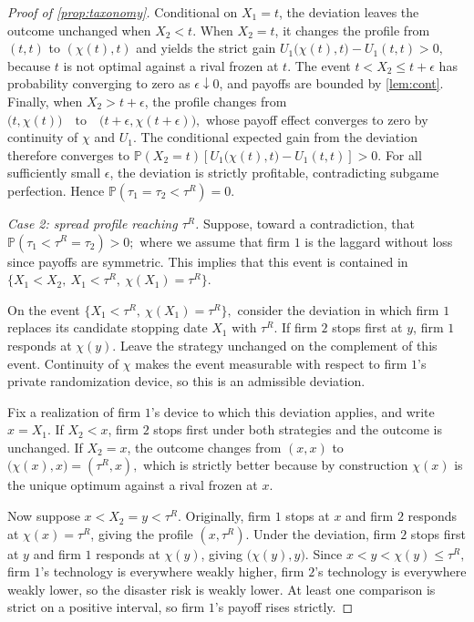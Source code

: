 \documentclass[12pt,reqno]{article}
\renewcommand{\Pr}{\mathbb{P}}
\theoremstyle{definition} \newtheorem{example}{Example}
\theoremstyle{definition} \newtheorem{condition}{Condition}
\theoremstyle{definition} \newtheorem{corollary}{Corollary}
\theoremstyle{definition} \newtheorem{claim}{Claim}
\theoremstyle{definition} \newtheorem{definition}{Definition}
\theoremstyle{definition} \newtheorem{conjecture}{Conjecture}
\theoremstyle{definition} \newtheorem{Lemma}{Lemma}
\theoremstyle{definition} \newtheorem{lemma}{Lemma}
\theoremstyle{plain} \newtheorem{theorem}{Theorem}
\theoremstyle{definition} \newtheorem{assumption}{Assumption}
\theoremstyle{definition} \newtheorem*{assumptionnonumber}{Assumption}
\theoremstyle{definition} \newtheorem*{theoremNoNumber}{Proposition}
\theoremstyle{definition}
\theoremstyle{definition}\newtheorem{proposition}{Proposition}
\theoremstyle{definition} \newtheorem{result}{Result}
\theoremstyle{definition} \newtheorem*{definitionNoNumber}{Definition}
\theoremstyle{definition} \newtheorem{Definition}{Definition}
\theoremstyle{definition} \newtheorem*{DefinitionNoNumber}{Definition}
\theoremstyle{definition} \newtheorem*{fact}{Fact}
\theoremstyle{definition} \newtheorem*{property}{Property}
\theoremstyle{definition} \newtheorem{remark}{Remark}
\begin{document}
\begin{proof}[Proof of \cref{prop:taxonomy}]
Conditional on $X_1=t$, the deviation leaves the outcome unchanged when $X_2<t$. When $X_2=t$, it changes the profile from $(t,t)$ to $(\chi(t),t)$ and yields the strict gain
$
U_1\bigl(\chi(t),t\bigr)-U_1(t,t)>0,
$
because $t$ is not optimal against a rival frozen at $t$. The event
$
t<X_2\leq t+\epsilon
$
has probability converging to zero as $\epsilon\downarrow0$, and payoffs are bounded by \cref{lem:cont}. Finally, when $X_2>t+\epsilon$, the profile changes from
$
\bigl(t,\chi(t)\bigr)
\quad\text{to}\quad
\bigl(t+\epsilon,\chi(t+\epsilon)\bigr),
$
whose payoff effect converges to zero by continuity of $\chi$ and $U_1$. The conditional expected gain from the deviation therefore converges to
$
\Pr(X_2=t)
\left[
U_1\bigl(\chi(t),t\bigr)-U_1(t,t)
\right]
>0.
$
For all sufficiently small $\epsilon$, the deviation is strictly profitable, contradicting subgame perfection. Hence
$
\Pr(\tau_1=\tau_2<\tau^R)=0.
$

\smallskip
\noindent\emph{Case 2: spread profile reaching $\tau^R$.}
Suppose, toward a contradiction, that
$
\Pr(\tau_1<\tau^R=\tau_2)>0;
$
where we assume that firm $1$ is the laggard without loss since payoffs are symmetric. This implies
that this event is contained in
$
\{X_1<X_2,\ X_1<\tau^R,\ \chi(X_1)=\tau^R\}.
$

On the event
$
\{X_1<\tau^R,\ \chi(X_1)=\tau^R\},
$
consider the deviation in which firm $1$ replaces its candidate stopping date $X_1$ with $\tau^R$. If firm
$2$ stops first at $y$, firm $1$ responds at $\chi(y)$. Leave the strategy
unchanged on the complement of this event. Continuity of $\chi$ makes the
event measurable with respect to firm $1$'s private randomization device, so
this is an admissible deviation.

Fix a realization of firm $1$'s device to which this deviation applies, and
write $x=X_1$. If $X_2<x$, firm $2$ stops first under both strategies and the
outcome is unchanged. If $X_2=x$, the outcome
changes from $(x,x)$ to
$
\bigl(\chi(x),x\bigr)=(\tau^R,x),
$
which is strictly better because by construction $\chi(x)$ is the unique optimum against a
rival frozen at $x$.

Now suppose $x<X_2=y<\tau^R$. Originally, firm $1$ stops at $x$ and firm
$2$ responds at $\chi(x)=\tau^R$, giving the profile $(x,\tau^R)$. Under
the deviation, firm $2$ stops first at $y$ and firm $1$ responds at
$\chi(y)$, giving $\bigl(\chi(y),y\bigr)$. Since
$
x<y<\chi(y)\leq\tau^R,
$
firm $1$'s technology is everywhere weakly higher, firm $2$'s technology
is everywhere weakly lower, so the disaster
risk is weakly lower. At least one comparison is strict on a positive
interval, so firm $1$'s payoff rises strictly.


\end{proof}
\end{document}
